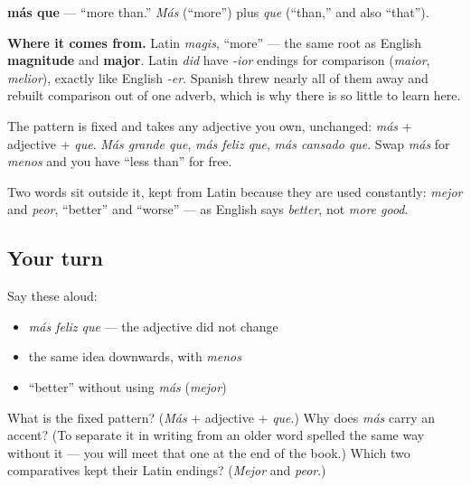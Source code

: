 \begin{cousinweb}
\textbf{más que} — \textquotedblleft{}more than.\textquotedblright{} \emph{Más} (\textquotedblleft{}more\textquotedblright{}) plus \emph{que} (\textquotedblleft{}than,\textquotedblright{} and also \textquotedblleft{}that\textquotedblright{}).

\textbf{Where it comes from.} Latin \emph{magis}, \textquotedblleft{}more\textquotedblright{} — the same root as English \textbf{magnitude} and \textbf{major}. Latin \emph{did} have \emph{-ior} endings for comparison (\emph{maior}, \emph{melior}), exactly like English \emph{-er}. Spanish threw nearly all of them away and rebuilt comparison out of one adverb, which is why there is so little to learn here.
\end{cousinweb}

\begin{grammarlens}[title={What you've built}]
The pattern is fixed and takes any adjective you own, unchanged: \emph{más} + adjective + \emph{que}. \emph{Más grande que}, \emph{más feliz que}, \emph{más cansado que}. Swap \emph{más} for \emph{menos} and you have \textquotedblleft{}less than\textquotedblright{} for free.

Two words sit outside it, kept from Latin because they are used constantly: \emph{mejor} and \emph{peor}, \textquotedblleft{}better\textquotedblright{} and \textquotedblleft{}worse\textquotedblright{} — as English says \emph{better}, not \emph{more good}.
\end{grammarlens}

\subsection*{Your turn}
Say these aloud:

\begin{itemize}
\raggedright
  \item \emph{más feliz que} — the adjective did not change
  \item the same idea downwards, with \emph{menos}
  \item \textquotedblleft{}better\textquotedblright{} without using \emph{más} (\emph{mejor})
\end{itemize}

\begin{tcolorbox}[breakable,colback=teal!4,colframe=teal!35!black,title={Before you move on}]
What is the fixed pattern? (\emph{Más} + adjective + \emph{que}.) Why does \emph{más} carry an accent? (To separate it in writing from an older word spelled the same way without it — you will meet that one at the end of the book.) Which two comparatives kept their Latin endings? (\emph{Mejor} and \emph{peor}.)
\end{tcolorbox}
